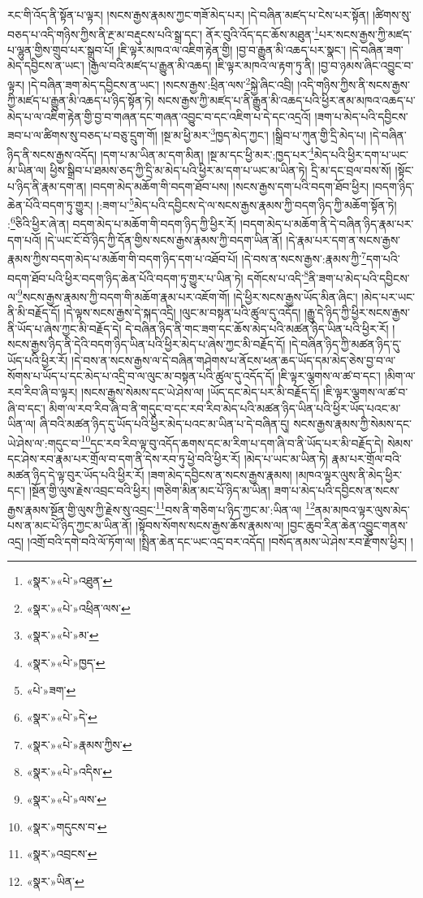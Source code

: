 རང་གི་འོད་ནི་སྟོན་པ་ལྟར། །སངས་རྒྱས་རྣམས་ཀྱང་གཟོ་མེད་པར། །དེ་བཞིན་མཛད་པ་ངེས་པར་སྟོན། །ཚིགས་སུ་བཅད་པ་འདི་གཉིས་ཀྱིས་ནི་རྔ་མ་བརྡུངས་པའི་སྒྲ་དང་། ནོར་བུའི་འོད་དང་ཆོས་མཐུན་\footnote{«སྣར་»«པེ་»འཐུན་}པར་སངས་རྒྱས་ཀྱི་མཛད་པ་ལྷུན་གྱིས་གྲུབ་པར་སྒྲུབ་པོ། །ཇི་ལྟར་མཁའ་ལ་འཇིག་རྟེན་གྱི། །བྱ་བ་རྒྱུན་མི་འཆད་པར་སྣང་། །དེ་བཞིན་ཟག་མེད་དབྱིངས་ན་ཡང་། །རྒྱལ་བའི་མཛད་པ་རྒྱུན་མི་འཆད། །ཇི་ལྟར་མཁའ་ལ་རྟག་ཏུ་ནི། །བྱ་བ་ཉམས་ཞིང་འབྱུང་བ་ལྟར། །དེ་བཞིན་ཟག་མེད་དབྱིངས་ན་ཡང་། །སངས་རྒྱས་:ཕྲིན་ལས་\footnote{«སྣར་»«པེ་»འཕྲིན་ལས་}སྐྱེ་ཞིང་འབྲི། །འདི་གཉིས་ཀྱིས་ནི་སངས་རྒྱས་ཀྱི་མཛད་པ་རྒྱུན་མི་འཆད་པ་ཉིད་སྟོན་ཏེ། སངས་རྒྱས་ཀྱི་མཛད་པ་ནི་རྒྱུན་མི་འཆད་པའི་ཕྱིར་ནམ་མཁའ་འཆད་པ་མེད་པ་ལ་འཇིག་རྟེན་གྱི་བྱ་བ་གཞན་དང་གཞན་འབྱུང་བ་དང་འཇིག་པ་དེ་དང་འདྲའོ། །ཟག་པ་མེད་པའི་དབྱིངས་ཟབ་པ་ལ་ཚིགས་སུ་བཅད་པ་བཅུ་དྲུག་གོ། །སྔ་མ་ཕྱི་མར་\footnote{«སྣར་»«པེ་»མ་}ཁྱད་མེད་ཀྱང་། །སྒྲིབ་པ་ཀུན་གྱི་དྲི་མེད་པ། །དེ་བཞིན་ཉིད་ནི་སངས་རྒྱས་འདོད། །དག་པ་མ་ཡིན་མ་དག་མིན། །སྔ་མ་དང་ཕྱི་མར་:ཁྱད་པར་\footnote{«སྣར་»«པེ་»ཁྱད་}མེད་པའི་ཕྱིར་དག་པ་ཡང་མ་ཡིན་ལ། ཕྱིས་སྒྲིབ་པ་ཐམས་ཅད་ཀྱི་དྲི་མ་མེད་པའི་ཕྱིར་མ་དག་པ་ཡང་མ་ཡིན་ཏེ། དྲི་མ་དང་བྲལ་བས་སོ། །སྟོང་པ་ཉིད་ནི་རྣམ་དག་ན། །བདག་མེད་མཆོག་གི་བདག་ཐོབ་པས། །སངས་རྒྱས་དག་པའི་བདག་ཐོབ་ཕྱིར། །བདག་ཉིད་ཆེན་པོའི་བདག་ཏུ་གྱུར། །:ཟག་པ་\footnote{«པེ་»ཟག་}མེད་པའི་དབྱིངས་དེ་ལ་སངས་རྒྱས་རྣམས་ཀྱི་བདག་ཉིད་ཀྱི་མཆོག་སྟོན་ཏེ། :\footnote{«སྣར་»«པེ་»དེ་}ཅིའི་ཕྱིར་ཞེ་ན། བདག་མེད་པ་མཆོག་གི་བདག་ཉིད་ཀྱི་ཕྱིར་རོ། །བདག་མེད་པ་མཆོག་ནི་དེ་བཞིན་ཉིད་རྣམ་པར་དག་པའོ། །དེ་ཡང་ངོ་བོ་ཉིད་ཀྱི་དོན་གྱིས་སངས་རྒྱས་རྣམས་ཀྱི་བདག་ཡིན་ནོ། །དེ་རྣམ་པར་དག་ན་སངས་རྒྱས་རྣམས་ཀྱིས་བདག་མེད་པ་མཆོག་གི་བདག་ཉིད་དག་པ་འཐོབ་པོ། །དེ་བས་ན་སངས་རྒྱས་:རྣམས་ཀྱི་\footnote{«སྣར་»«པེ་»རྣམས་ཀྱིས་}དག་པའི་བདག་ཐོབ་པའི་ཕྱིར་བདག་ཉིད་ཆེན་པོའི་བདག་ཏུ་གྱུར་པ་ཡིན་ཏེ། དགོངས་པ་འདི་\footnote{«སྣར་»«པེ་»འདིས་}ནི་ཟག་པ་མེད་པའི་དབྱིངས་ལ་\footnote{«སྣར་»«པེ་»ལས་}སངས་རྒྱས་རྣམས་ཀྱི་བདག་གི་མཆོག་རྣམ་པར་འཇོག་གོ། །དེ་ཕྱིར་སངས་རྒྱས་ཡོད་མིན་ཞིང་། །མེད་པར་ཡང་ནི་མི་བརྗོད་དོ། །དེ་ལྟས་སངས་རྒྱས་དེ་སྐད་འདྲི། །ལུང་མ་བསྟན་པའི་ཚུལ་དུ་འདོད། །རྒྱུ་དེ་ཉིད་ཀྱི་ཕྱིར་སངས་རྒྱས་ནི་ཡོད་པ་ཞེས་ཀྱང་མི་བརྗོད་དེ། དེ་བཞིན་ཉིད་ནི་གང་ཟག་དང་ཆོས་མེད་པའི་མཚན་ཉིད་ཡིན་པའི་ཕྱིར་རོ། །སངས་རྒྱས་ཉིད་ནི་དེའི་བདག་ཉིད་ཡིན་པའི་ཕྱིར་མེད་པ་ཞེས་ཀྱང་མི་བརྗོད་དོ། །དེ་བཞིན་ཉིད་ཀྱི་མཚན་ཉིད་དུ་ཡོད་པའི་ཕྱིར་རོ། །དེ་བས་ན་སངས་རྒྱས་ལ་དེ་བཞིན་གཤེགས་པ་ནོངས་ཕན་ཆད་ཡོད་དམ་མེད་ཅེས་བྱ་བ་ལ་སོགས་པ་ཡོད་པ་དང་མེད་པ་འདྲི་བ་ལ་ལུང་མ་བསྟན་པའི་ཚུལ་དུ་འདོད་དོ། །ཇི་ལྟར་ལྕགས་ལ་ཚ་བ་དང་། །མིག་ལ་རབ་རིབ་ཞི་བ་ལྟར། །སངས་རྒྱས་སེམས་དང་ཡེ་ཤེས་ལ། །ཡོད་དང་མེད་པར་མི་བརྗོད་དོ། །ཇི་ལྟར་ལྕགས་ལ་ཚ་བ་ཞི་བ་དང་། མིག་ལ་རབ་རིབ་ཞི་བ་ནི་གདུང་བ་དང་རབ་རིབ་མེད་པའི་མཚན་ཉིད་ཡིན་པའི་ཕྱིར་ཡོད་པའང་མ་ཡིན་ལ། ཞི་བའི་མཚན་ཉིད་དུ་ཡོད་པའི་ཕྱིར་མེད་པའང་མ་ཡིན་པ་དེ་བཞིན་དུ། སངས་རྒྱས་རྣམས་ཀྱི་སེམས་དང་ཡེ་ཤེས་ལ་:གདུང་བ་\footnote{«སྣར་»གདུངས་བ་}དང་རབ་རིབ་ལྟ་བུ་འདོད་ཆགས་དང་མ་རིག་པ་དག་ཞི་བ་ནི་ཡོད་པར་མི་བརྗོད་དེ། སེམས་དང་ཤེས་རབ་རྣམ་པར་གྲོལ་བ་དག་ནི་དེས་རབ་ཏུ་ཕྱེ་བའི་ཕྱིར་རོ། །མེད་པ་ཡང་མ་ཡིན་ཏེ། རྣམ་པར་གྲོལ་བའི་མཚན་ཉིད་དེ་ལྟ་བུར་ཡོད་པའི་ཕྱིར་རོ། །ཟག་མེད་དབྱིངས་ན་སངས་རྒྱས་རྣམས། །མཁའ་ལྟར་ལུས་ནི་མེད་ཕྱིར་དང་། །སྔོན་གྱི་ལུས་རྗེས་འབྲང་བའི་ཕྱིར། །གཅིག་མིན་མང་པོ་ཉིད་མ་ཡིན། ཟག་པ་མེད་པའི་དབྱིངས་ན་སངས་རྒྱས་རྣམས་སྔོན་གྱི་ལུས་ཀྱི་རྗེས་སུ་འབྲང་\footnote{«སྣར་»འབྲངས་}བས་ནི་གཅིག་པ་ཉིད་ཀྱང་མ་:ཡིན་ལ། \footnote{«སྣར་»ཡིན་}ནམ་མཁའ་ལྟར་ལུས་མེད་པས་ན་མང་པོ་ཉིད་ཀྱང་མ་ཡིན་ནོ། །སྟོབས་སོགས་སངས་རྒྱས་ཆོས་རྣམས་ལ། །བྱང་ཆུབ་རིན་ཆེན་འབྱུང་གནས་འདྲ། །འགྲོ་བའི་དགེ་བའི་ལོ་ཏོག་ལ། །སྤྲིན་ཆེན་དང་ཡང་འདྲ་བར་འདོད། །བསོད་ནམས་ཡེ་ཤེས་རབ་རྫོགས་ཕྱིར། །
